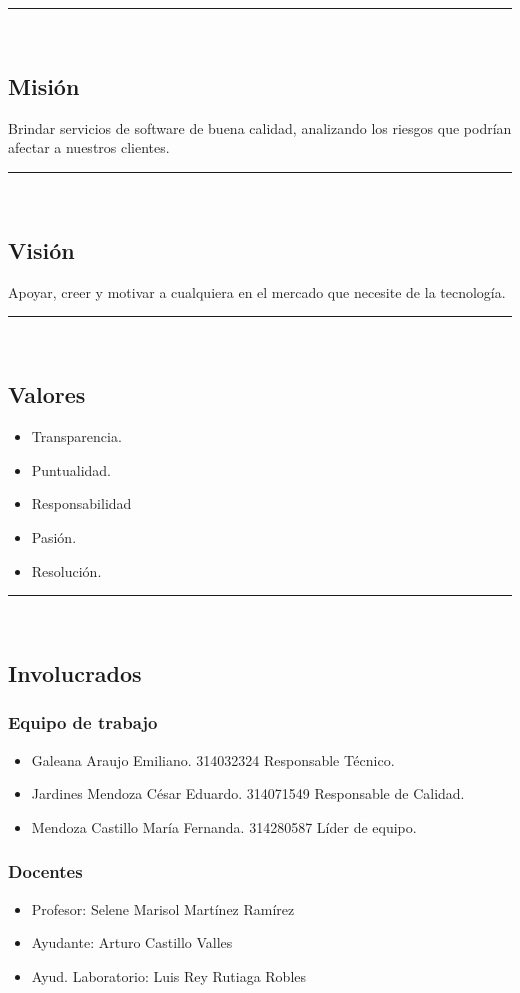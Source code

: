 \documentclass{article}
\begin{document}
\rule{0.8\textwidth}{.8pt}\\

\subsection*{Misión}
Brindar servicios de software de buena calidad, analizando los riesgos que
podrían afectar a nuestros clientes.

\rule{0.8\textwidth}{.8pt}\\

\subsection*{Visión}
Apoyar, creer y motivar a cualquiera en el mercado que necesite de la tecnología.

\rule{0.8\textwidth}{.8pt}\\

\subsection*{Valores}

\begin{itemize}
\item Transparencia.
\item Puntualidad.
\item Responsabilidad
\item Pasión.
\item Resolución.
\end{itemize}

\rule{0.8\textwidth}{.8pt}\\

\subsection*{Involucrados}
\subsubsection*{Equipo de trabajo}
\begin{itemize}
\item Galeana Araujo Emiliano. 314032324 Responsable Técnico.
\item Jardines Mendoza César Eduardo. 314071549 Responsable de Calidad.
\item Mendoza Castillo María Fernanda. 314280587 Líder de equipo.
\end{itemize}

\subsubsection*{Docentes}
\begin{itemize}
\item Profesor: Selene Marisol Martínez Ramírez
\item Ayudante: Arturo Castillo Valles
\item Ayud. Laboratorio: Luis Rey Rutiaga Robles
\end{itemize}
\end{document}
